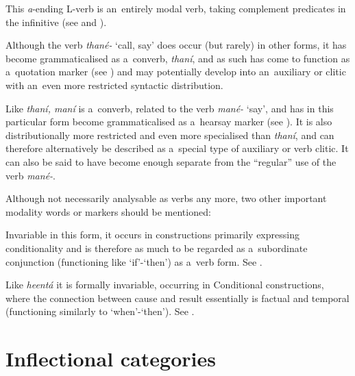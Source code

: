  This \textit{a}-ending L-verb is an~entirely modal verb, taking complement predicates in the infinitive (see  and ).



 Although the verb \textit{thané-} `call, say' does occur (but rarely) in other forms, it has become grammaticalised as a~converb, \textit{thaní}, and as such has come to function as a~quotation marker (see ) and may potentially develop into an~auxiliary or clitic with an~even more restricted syntactic distribution.



 Like \textit{thaní, maní} is a~converb, related to the verb \textit{mané-} `say', and has in this particular form become grammaticalised as a~hearsay marker (see ). It is also distributionally more restricted and even more specialised than \textit{thaní}, and can therefore alternatively be described as a~special type of auxiliary or verb clitic. It can also be said to have become enough separate from the ``regular'' use of the verb \textit{mané-}.



Although not necessarily analysable as verbs any more, two other important modality words or markers should be mentioned:



 Invariable in this form, it occurs in constructions primarily expressing conditionality and is therefore as much to be regarded as a~subordinate conjunction (functioning like `if'-`then') as a~verb form. See .



 Like \textit{heentá} it is formally invariable, occurring in Conditional constructions, where the connection between cause and result essentially is factual and temporal (functioning similarly to `when'-`then'). See .


\section{Inflectional categories}
\label{sec:8-4}

